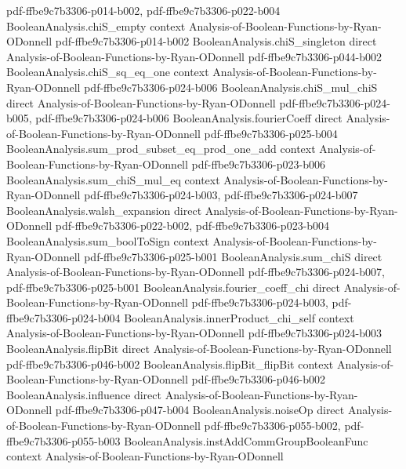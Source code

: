 \begin{theorem}
  {pdf-ffbe9c7b3306-p014-b002,
    pdf-ffbe9c7b3306-p022-b004}
\proofstep
  {BooleanAnalysis.chiS_empty}
  {context}
  {Analysis-of-Boolean-Functions-by-Ryan-ODonnell}
  {pdf-ffbe9c7b3306-p014-b002}
\proofstep
  {BooleanAnalysis.chiS_singleton}
  {direct}
  {Analysis-of-Boolean-Functions-by-Ryan-ODonnell}
  {pdf-ffbe9c7b3306-p044-b002}
\proofstep
  {BooleanAnalysis.chiS_sq_eq_one}
  {context}
  {Analysis-of-Boolean-Functions-by-Ryan-ODonnell}
  {pdf-ffbe9c7b3306-p024-b006}
\proofstep
  {BooleanAnalysis.chiS_mul_chiS}
  {direct}
  {Analysis-of-Boolean-Functions-by-Ryan-ODonnell}
  {pdf-ffbe9c7b3306-p024-b005,
    pdf-ffbe9c7b3306-p024-b006}
\proofstep
  {BooleanAnalysis.fourierCoeff}
  {direct}
  {Analysis-of-Boolean-Functions-by-Ryan-ODonnell}
  {pdf-ffbe9c7b3306-p025-b004}
\proofstep
  {BooleanAnalysis.sum_prod_subset_eq_prod_one_add}
  {context}
  {Analysis-of-Boolean-Functions-by-Ryan-ODonnell}
  {pdf-ffbe9c7b3306-p023-b006}
\proofstep
  {BooleanAnalysis.sum_chiS_mul_eq}
  {context}
  {Analysis-of-Boolean-Functions-by-Ryan-ODonnell}
  {pdf-ffbe9c7b3306-p024-b003,
    pdf-ffbe9c7b3306-p024-b007}
\proofstep
  {BooleanAnalysis.walsh_expansion}
  {direct}
  {Analysis-of-Boolean-Functions-by-Ryan-ODonnell}
  {pdf-ffbe9c7b3306-p022-b002,
    pdf-ffbe9c7b3306-p023-b004}
\proofstep
  {BooleanAnalysis.sum_boolToSign}
  {context}
  {Analysis-of-Boolean-Functions-by-Ryan-ODonnell}
  {pdf-ffbe9c7b3306-p025-b001}
\proofstep
  {BooleanAnalysis.sum_chiS}
  {direct}
  {Analysis-of-Boolean-Functions-by-Ryan-ODonnell}
  {pdf-ffbe9c7b3306-p024-b007,
    pdf-ffbe9c7b3306-p025-b001}
\proofstep
  {BooleanAnalysis.fourier_coeff_chi}
  {direct}
  {Analysis-of-Boolean-Functions-by-Ryan-ODonnell}
  {pdf-ffbe9c7b3306-p024-b003,
    pdf-ffbe9c7b3306-p024-b004}
\proofstep
  {BooleanAnalysis.innerProduct_chi_self}
  {context}
  {Analysis-of-Boolean-Functions-by-Ryan-ODonnell}
  {pdf-ffbe9c7b3306-p024-b003}
\proofstep
  {BooleanAnalysis.flipBit}
  {direct}
  {Analysis-of-Boolean-Functions-by-Ryan-ODonnell}
  {pdf-ffbe9c7b3306-p046-b002}
\proofstep
  {BooleanAnalysis.flipBit_flipBit}
  {context}
  {Analysis-of-Boolean-Functions-by-Ryan-ODonnell}
  {pdf-ffbe9c7b3306-p046-b002}
\proofstep
  {BooleanAnalysis.influence}
  {direct}
  {Analysis-of-Boolean-Functions-by-Ryan-ODonnell}
  {pdf-ffbe9c7b3306-p047-b004}
\proofstep
  {BooleanAnalysis.noiseOp}
  {direct}
  {Analysis-of-Boolean-Functions-by-Ryan-ODonnell}
  {pdf-ffbe9c7b3306-p055-b002,
    pdf-ffbe9c7b3306-p055-b003}
\proofstep
  {BooleanAnalysis.instAddCommGroupBooleanFunc}
  {context}
  {Analysis-of-Boolean-Functions-by-Ryan-ODonnell}

\end{theorem}
